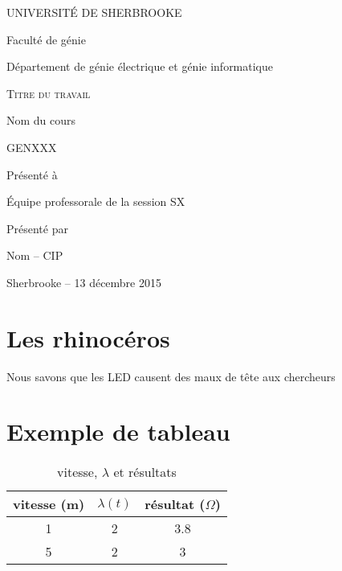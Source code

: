 \documentclass[letterpaper,11pt]{report}
\begin{document}
\begin{titlepage}
  \setlength{\parskip}{0em}
  
  \centering \par
  \uppercase{Université de Sherbrooke}\par
  Faculté de génie\par
  Département de génie électrique et génie informatique
  
  \vspace{3cm}
  {\scshape\LARGE\centering Titre du travail \par}
  \vspace{3cm}
  Nom du cours\par
  GENXXX
  \vspace{3cm}

  {\centering Présenté à \par}
  Équipe professorale de la session SX
  \vspace{4cm}
  
  {\centering Présenté par \par}
  {\centering Nom -- CIP \par}
  

  \vfill
  {\centering Sherbrooke -- 13 décembre 2015}

\end{titlepage}

\setcounter{page}{1}

\renewcommand{\contentsname}{Sommaire}
\tableofcontents
\setlength{\parskip}{1em}

\newpage

\setcounter{page}{1}

\section{Les rhinocéros}
Nous savons que les LED causent des maux de tête aux chercheurs \cite{FuturaDEL2}

\section{Exemple de tableau}

\begin{table}
  \begin{center}
    \caption{vitesse, $\lambda$ et résultats}
    \begin{tabular}{ccc}
      \hline
      \bf vitesse (m) & \bf $\lambda (t)$ & \bf résultat ($\Omega$) \\
      \hline
      \hline
      1 & 2 & 3.8 \\
      5 & 2 & 3 \\
      \hline
    \end{tabular}
  \end{center}
\end{table}




\end{document}
